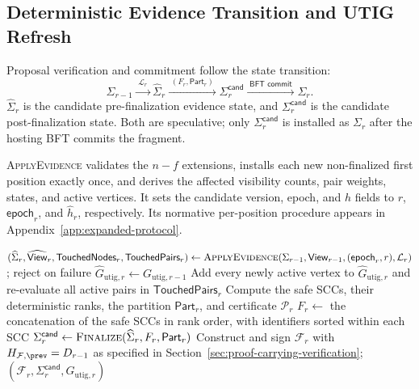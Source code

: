 \subsection{Deterministic Evidence Transition and UTIG Refresh}
\label{sec:evidence-transition}

Proposal verification and commitment follow the state transition:
\begin{equation}
 \Sigma_{r-1}\xrightarrow{\;\mathcal L_r\;}
 \widehat\Sigma_r
 \xrightarrow{\;(F_r,\mathsf{Part}_r)\;}
 \Sigma_r^{\mathsf{cand}}
 \xrightarrow{\;\textsf{BFT commit}\;}\Sigma_r.
 \label{eq:proposal-state-transition}
\end{equation}
$\widehat\Sigma_r$ is the candidate pre-finalization evidence state, and $\Sigma_r^{\mathsf{cand}}$ is the candidate post-finalization state. Both are speculative; only $\Sigma_r^{\mathsf{cand}}$ is installed as $\Sigma_r$ after the hosting BFT commits the fragment.

\textsc{ApplyEvidence} validates the $n-f$ extensions, installs each new non-finalized first position exactly once, and derives the affected visibility counts, pair weights, states, and active vertices.  It sets the candidate version, epoch, and $h$ fields to $r$, $\mathsf{epoch}_r$, and $\widehat h_r$, respectively. Its normative per-position procedure appears in Appendix~\ref{app:expanded-protocol}.

\begin{algorithm}[h!]
\caption{\textsc{BuildFragment}: Leader-Side Construction}
\label{alg:build-fragment}
\footnotesize
{}
$(\widehat\Sigma_r,\widehat{\mathsf{View}}_r,
  \mathsf{TouchedNodes}_r,\mathsf{TouchedPairs}_r)
  \gets\textsc{ApplyEvidence}(\Sigma_{r-1},\mathsf{View}_{r-1}, (\mathsf{epoch}_r,r),\mathcal L_r)$; reject on failure\;
$\widehat G_{\mathrm{utig},r}\gets G_{\mathrm{utig},r-1}$\;
Add every newly active vertex to $\widehat G_{\mathrm{utig},r}$ and
re-evaluate all active pairs in $\mathsf{TouchedPairs}_r$\;
Compute the safe SCCs, their deterministic ranks, the partition $\mathsf{Part}_r$, and certificate $\mathcal P_r$\;
$F_r\gets$ the concatenation of the safe SCCs in rank order, with identifiers sorted within each SCC\;
$\Sigma_r^{\mathsf{cand}}\gets
  \textsc{Finalize}(\widehat\Sigma_r,F_r,\mathsf{Part}_r)$\;
Construct and sign $\mathcal F_r$ with $H_{\mathcal F,\prev}=D_{r-1}$ as specified in Section~\ref{sec:proof-carrying-verification}; \KwRet
$(\mathcal F_r,\Sigma_r^{\mathsf{cand}},\widehat G_{\mathrm{utig},r})$\;
\end{algorithm}

